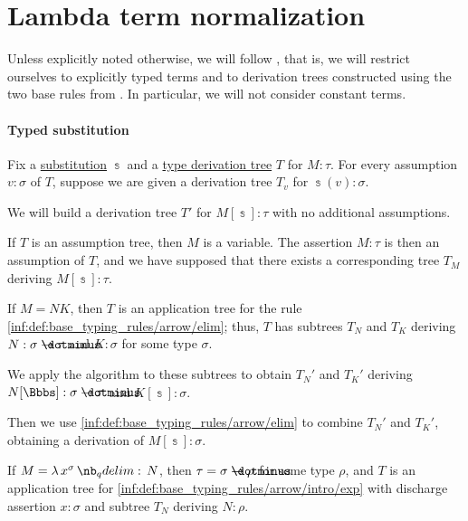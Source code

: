 \section{Lambda term normalization}\label{sec:lambda_term_normalization}

Unless explicitly noted otherwise, we will follow , that is, we will restrict ourselves to explicitly typed terms and to derivation trees constructed using the two base rules from . In particular, we will not consider constant terms.

\paragraph{Typed substitution}

\begin{algorithm}\label{alg:typed_substitution}
  Fix a \hyperref[def:lambda_substitution]{substitution} \( \Bbbs \) and a \hyperref[def:type_derivation_tree]{type derivation tree} \( T \) for \( M: \tau \). For every assumption \( v: \sigma \) of \( T \), suppose we are given a derivation tree \( T_v \) for \( \Bbbs(v): \sigma \).

  We will build a derivation tree \( T' \) for \( M[\Bbbs]: \tau \) with no additional assumptions.

  \begin{thmenum}
     If \( T \) is an assumption tree, then \( M \) is a variable. The assertion \( M: \tau \) is then an assumption of \( T \), and we have supposed that there exists a corresponding tree \( T_M \) deriving \( M[\Bbbs]: \tau \).

     If \( M = NK \), then \( T \) is an application tree for the rule \ref{inf:def:base_typing_rules/arrow/elim}; thus, \( T \) has subtrees \( T_N \) and \( T_K \) deriving \( N: \sigma \synimplies \tau \) and \( K: \sigma \) for some type \( \sigma \).

    We apply the algorithm to these subtrees to obtain \( T_N' \) and \( T_K' \) deriving \( N[\Bbbs]: \sigma \synimplies \tau \) and \( K[\Bbbs]: \sigma \).

    Then we use \ref{inf:def:base_typing_rules/arrow/elim} to combine \( T_N' \) and \( T_K' \), obtaining a derivation of \( M[\Bbbs]: \sigma \).

     If \( M = \qabs {x^\sigma} N \), then \( \tau = \sigma \synimplies \rho \) for some type \( \rho \), and \( T \) is an application tree for \ref{inf:def:base_typing_rules/arrow/intro/exp} with discharge assertion \( x: \sigma \) and subtree \( T_N \) deriving \( N: \rho \).


\end{thmenum}
\end{algorithm}
